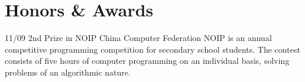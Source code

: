 \documentclass[a4paper]{friggeri-cv}
\begin{document}
\section{Honors \& Awards}
\begin{entrylist}
  \entry
  {11/09}
  {2nd Prize in NOIP}
  {China Computer Federation}
  {NOIP is an annual competitive programming competition for secondary school students.  The contest consists of five hours of computer programming on an individual basis, solving problems of an algorithmic nature.}
\end{entrylist}

\end{document}

